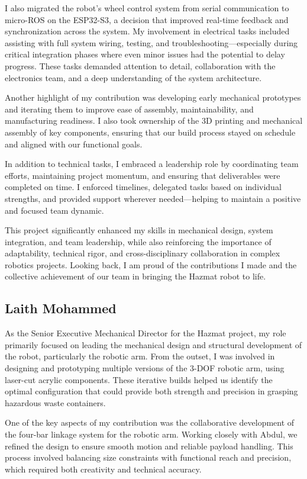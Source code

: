 \documentclass{article}
\begin{document}
\begin{appendices}
I also migrated the robot's wheel control system from serial communication to micro-ROS on the ESP32-S3, a decision that improved real-time feedback and synchronization across the system. My involvement in electrical tasks included assisting with full system wiring, testing, and troubleshooting---especially during critical integration phases where even minor issues had the potential to delay progress. These tasks demanded attention to detail, collaboration with the electronics team, and a deep understanding of the system architecture.

Another highlight of my contribution was developing early mechanical prototypes and iterating them to improve ease of assembly, maintainability, and manufacturing readiness. I also took ownership of the 3D printing and mechanical assembly of key components, ensuring that our build process stayed on schedule and aligned with our functional goals.

In addition to technical tasks, I embraced a leadership role by coordinating team efforts, maintaining project momentum, and ensuring that deliverables were completed on time. I enforced timelines, delegated tasks based on individual strengths, and provided support wherever needed---helping to maintain a positive and focused team dynamic.

This project significantly enhanced my skills in mechanical design, system integration, and team leadership, while also reinforcing the importance of adaptability, technical rigor, and cross-disciplinary collaboration in complex robotics projects. Looking back, I am proud of the contributions I made and the collective achievement of our team in bringing the Hazmat robot to life.

\subsection*{Laith Mohammed}

As the Senior Executive Mechanical Director for the Hazmat project, my role primarily focused on leading the mechanical design and structural development of the robot, particularly the robotic arm. From the outset, I was involved in designing and prototyping multiple versions of the 3-DOF robotic arm, using laser-cut acrylic components. These iterative builds helped us identify the optimal configuration that could provide both strength and precision in grasping hazardous waste containers.

One of the key aspects of my contribution was the collaborative development of the four-bar linkage system for the robotic arm. Working closely with Abdul, we refined the design to ensure smooth motion and reliable payload handling. This process involved balancing size constraints with functional reach and precision, which required both creativity and technical accuracy.


\end{appendices}
\end{document}
